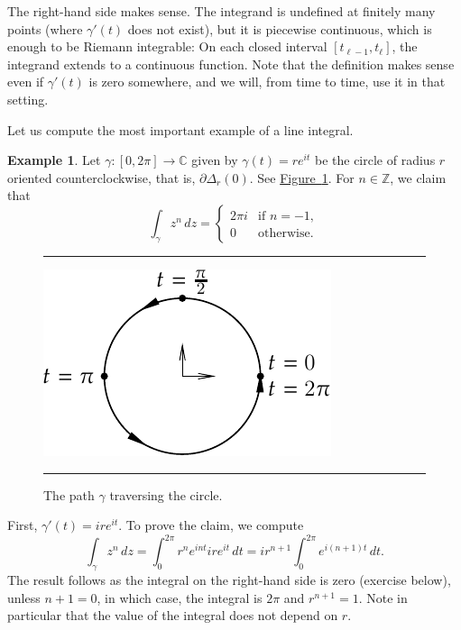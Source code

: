 \documentclass[12pt,openany]{book}
\newcommand{\C}{{\mathbb{C}}}
\newcommand{\Z}{{\mathbb{Z}}}
\theoremstyle{plain}
\theoremstyle{remark}
\theoremstyle{definition}
\newenvironment{myfig}{%
\begin{figure}[h!t]
\noindent\rule{\textwidth}{0.5pt}\vspace{12pt}\par\centering}%
{\par\noindent\rule{\textwidth}{0.5pt}
\end{figure}}
\theoremstyle{exercise}
\theoremstyle{example}
\newtheorem{example}[thm]{Example}
\newcommand{\figureref}[1]{\hyperref[#1]{Figure~\ref*{#1}}}
\begin{document}
The right-hand side makes sense.
The integrand is undefined
at finitely many points (where $\gamma'(t)$ does not exist),
but it is piecewise continuous, which is enough
to be Riemann integrable: On each closed interval
$[t_{\ell-1},t_\ell]$, the integrand extends to a continuous
function.
Note that the definition makes sense even if $\gamma'(t)$ is zero somewhere,
and we will, from time to time, use it in that setting.

Let us compute the most important example of a line integral.

\begin{example} \label{example:integralpowerz}
Let $\gamma \colon [0,2\pi] \to \C$ given by $\gamma(t) = r e^{it}$ be
the circle of radius $r$ oriented counterclockwise,
that is, $\partial \Delta_r(0)$.  See \figureref{fig:circlepath}.
For $n \in \Z$, we claim that
\begin{equation*}
\int_\gamma z^n \, dz
=
\begin{cases}
2\pi i & \text{if } n=-1, \\
0 & \text{otherwise.}
\end{cases}
\end{equation*}

\begin{myfig}
\includegraphics{figures/circlepath}
\caption{The path $\gamma$ traversing the circle.\label{fig:circlepath}}
\end{myfig}

First, $\gamma'(t) = i r e^{it}$.
To prove the claim, we compute
\begin{equation*}
\int_\gamma z^n \, dz
=
\int_0^{2\pi}
r^n
e^{int} i r e^{it} \, dt
=
i r^{n+1}
\int_0^{2\pi}
e^{i(n+1)t} \, dt .
\end{equation*}
The result follows as the integral on the right-hand side is zero
(exercise below), unless $n+1 = 0$,
in which case, the integral 
is $2\pi$ and $r^{n+1} = 1$.  Note in particular that the value of the
integral does not depend on $r$.
\end{example}
\end{document}

